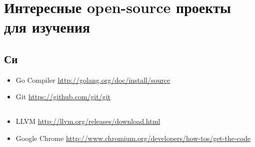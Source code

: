 ﻿\section{Интересные open-source проекты для изучения}

\subsection{Си}

\begin{itemize}
\item
Go Compiler \url{http://golang.org/doc/install/source}

\item
Git \url{https://github.com/git/git}
\end{itemize}

\subsection{\CPP}

\begin{itemize}
\item
LLVM \url{http://llvm.org/releases/download.html}

\item
Google Chrome \url{http://www.chromium.org/developers/how-tos/get-the-code}
\end{itemize}

